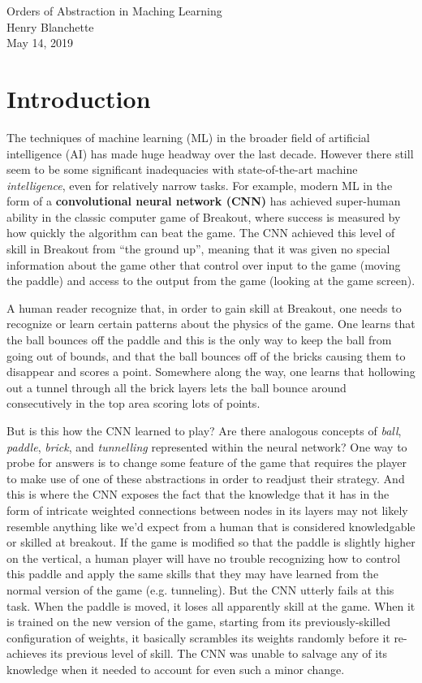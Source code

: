 \documentclass{article}
\renewcommand{\bf}{\textbf}
\renewcommand{\it}{\textit}
\begin{document}
\begin{center}
{\Large \sc Orders of Abstraction in Maching Learning}
\\[2em]
{Henry Blanchette}
\\[1em]
{May 14, 2019}
\end{center}

\vspace{2em}

\section{Introduction}

The techniques of machine learning (ML) in the broader field of artificial intelligence (AI) has made huge headway over the last decade.
However there still seem to be some significant inadequacies with state-of-the-art machine \it{intelligence}, even for relatively narrow tasks.
For example, modern ML in the form of a \bf{convolutional neural network (CNN)} has achieved super-human ability in the classic computer game of Breakout, where success is measured by how quickly the algorithm can beat the game.
The CNN achieved this level of skill in Breakout from ``the ground up'', meaning that it was given no special information about the game other that control over input to the game (moving the paddle) and access to the output from the game (looking at the game screen).

A human reader recognize that, in order to gain skill at Breakout, one needs to recognize or learn certain patterns about the physics of the game.
One learns that the ball bounces off the paddle and this is the only way to keep the ball from going out of bounds, and that the ball bounces off of the bricks causing them to disappear and scores a point.
Somewhere along the way, one learns that hollowing out a tunnel through all the brick layers lets the ball bounce around consecutively in the top area scoring lots of points.

But is this how the CNN learned to play? Are there analogous concepts of \it{ball}, \it{paddle}, \it{brick}, and \it{tunnelling} represented within the neural network?
One way to probe for answers is to change some feature of the game that requires the player to make use of one of these abstractions in order to readjust their strategy.
And this is where the CNN exposes the fact that the knowledge that it has in the form of intricate weighted connections between nodes in its layers may not likely resemble anything like we'd expect from a human that is considered knowledgable or skilled at breakout.
If the game is modified so that the paddle is slightly higher on the vertical, a human player will have no trouble recognizing how to control this paddle and apply the same skills that they may have learned from the normal version of the game (e.g. tunneling).
But the CNN utterly fails at this task.
When the paddle is moved, it loses all apparently skill at the game.
When it is trained on the new version of the game, starting from its previously-skilled configuration of weights, it basically scrambles its weights randomly before it re-achieves its previous level of skill.
The CNN was unable to salvage any of its knowledge when it needed to account for even such a minor change.
\end{document}
